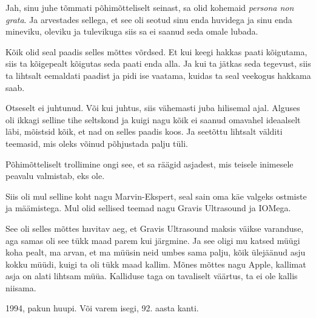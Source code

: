 
Jah, sinu juhe tõmmati põhimõtteliselt seinast,  sa olid kohemaid \emph{persona non grata}. Ja arvestades sellega, et see oli seotud sinu enda huvidega ja sinu enda mineviku, oleviku ja tulevikuga siis sa ei saanud seda omale lubada.


Kõik olid seal paadis selles mõttes võrdsed. Et kui keegi hakkas paati kõigutama, siis ta kõigepealt kõigutas seda paati enda alla. Ja kui ta jätkas seda tegevust, siis ta lihtsalt eemaldati paadist ja pidi ise vaatama, kuidas ta seal veekogus hakkama saab.


Otseselt ei juhtunud. Või kui juhtus, siis vähemasti juba hilisemal ajal. Alguses oli ikkagi selline tihe seltskond ja kuigi nagu kõik ei saanud omavahel ideaalselt läbi, mõistsid kõik, et nad on selles paadis  koos. Ja seetõttu lihtsalt välditi teemasid, mis oleks võinud põhjustada palju tüli.


Põhimõtteliselt trollimine ongi see, et sa räägid asjadest, mis teisele inimesele peavalu valmistab, eks ole.
                 

Siis oli mul selline koht nagu Marvin-Ekspert, seal sain oma käe valgeks ostmiste ja määmistega. Mul olid sellised teemad nagu Gravis Ultrasound ja IOMega.

See oli selles mõttes huvitav aeg, et Gravis Ultrasound maksis väikse varanduse, aga samas oli see tükk maad parem kui järgmine. Ja see oligi mu katsed müügi koha pealt, ma arvan, et ma müüsin neid umbes sama palju, kõik ülejäänud asju kokku müüdi, kuigi ta oli tükk maad kallim. Mõnes mõttes nagu Apple, kallimat asja on alati lihtsam müüa. Kalliduse taga on tavaliselt väärtus, ta ei ole kallis niisama.


1994, pakun huupi. Või varem isegi, 92. aasta kanti.


